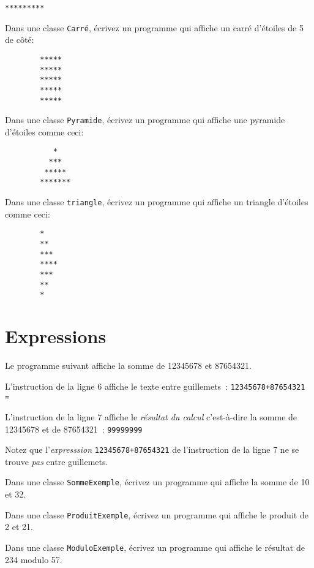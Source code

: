 \documentclass[a4paper,11pt]{article}
\begin{document}
		\texttt{*********}

	\Exercice{}
		Dans une classe \texttt{Carré}, écrivez un programme qui affiche un carré d'étoiles de 5 de côté:

		\begin{verbatim}
		*****
		*****
		*****
		*****
		*****
		\end{verbatim}

	\Exercice{}
		Dans une classe \texttt{Pyramide}, écrivez un programme qui affiche une pyramide d'étoiles comme ceci:

		\begin{verbatim}
		   *
		  ***
		 *****
		*******
		\end{verbatim}

	\Exercice{}
		Dans une classe \texttt{triangle}, écrivez un programme qui affiche un triangle d'étoiles comme ceci:

		\begin{verbatim}
		*
		**
		***
		****
		***
		**
		*
		\end{verbatim}





\section{Expressions}

	Le programme suivant affiche la somme de 12345678 et 87654321.
	

	L'instruction de la ligne 6 affiche le texte entre guillemets~: \texttt{12345678+87654321 = }
	
	L'instruction de la ligne 7 affiche le \emph{résultat du calcul} c'est-à-dire la somme de 12345678 et de 87654321~: 
	\texttt{99999999}
	
	Notez que l'\emph{expresssion} \texttt{12345678+87654321} de l'instruction de la ligne 7 
	ne se trouve \emph{pas} entre guillemets.

	\hspeparator


	\Exercice{}
		Dans une classe \texttt{SommeExemple}, écrivez un programme qui affiche la somme de 10 et 32.

	\Exercice{}
		Dans une classe \texttt{ProduitExemple}, écrivez un programme qui affiche le produit de 2 et 21.
	
	\Exercice{}
		Dans une classe \texttt{ModuloExemple}, écrivez un programme qui affiche le résultat de 234 modulo 57.
\end{document}
